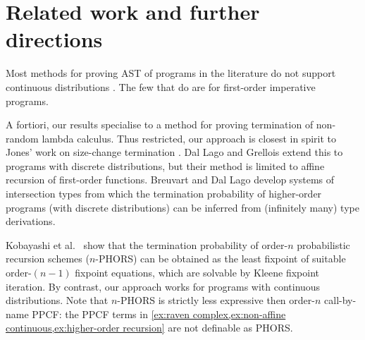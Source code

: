 \section{Related work and further directions}
\label{sec:related}

 

Most methods for proving AST of programs in the literature do not support continuous distributions \cite{DBLP:journals/toplas/LagoG19,DBLP:journals/jacm/KaminskiKMO18,DBLP:conf/lics/OlmedoKKM16,DBLP:conf/lics/KobayashiLG19,DBLP:conf/mfcs/KaminskiK15,DBLP:series/mcs/McIverM05}.
The few that do \cite{DBLP:conf/popl/FioritiH15,DBLP:conf/pldi/ChenH20,DBLP:journals/toplas/ChatterjeeFNH18} are for first-order imperative programs.

A fortiori, our results specialise to a method for proving termination of non-random lambda calculus. 
Thus restricted, our approach is closest in spirit to Jones' work on size-change termination \cite{DBLP:journals/lmcs/JonesB08,DBLP:conf/aplas/SereniJ05}. 
Dal Lago and Grellois \cite{DBLP:journals/toplas/LagoG19} extend this to programs with discrete distributions, but their method is limited to affine recursion of first-order functions.
Breuvart and Dal Lago \cite{DBLP:conf/ppdp/BreuvartL18} develop systems of intersection types from which the termination probability of higher-order programs (with discrete distributions) can be inferred from (infinitely many) type derivations. 

Kobayashi et al.~\cite{DBLP:conf/lics/KobayashiLG19} show that the termination probability of order-$n$ probabilistic recursion schemes ($n$-PHORS) can be obtained as the least fixpoint of suitable order-$(n-1)$ fixpoint equations, which are solvable by Kleene fixpoint iteration.  
By contrast, our approach works for programs with continuous distributions. 
Note that $n$-PHORS is strictly less expressive then order-$n$ call-by-name PPCF:
the PPCF terms in \cref{ex:raven complex,ex:non-affine continuous,ex:higher-order recursion}
are not definable as PHORS.

